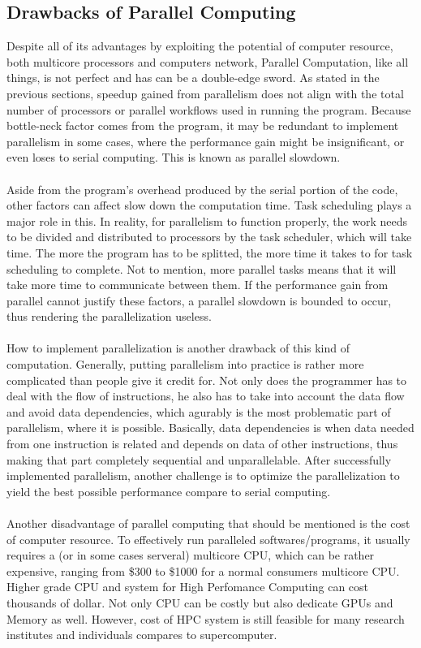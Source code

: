\subsection{Drawbacks of Parallel Computing}
Despite all of its advantages by exploiting the potential of computer resource, both multicore processors and computers network, Parallel Computation, like all things, is not perfect and has can be a double-edge sword. As stated in the previous sections, speedup gained from parallelism does not align with the total number of processors or parallel workflows used in running the program. Because bottle-neck factor comes from the program, it may be redundant to implement parallelism in some cases, where the performance gain might be insignificant, or even loses to serial computing. This is known as parallel slowdown. \\
~\\
Aside from the program's overhead produced by the serial portion of the code, other factors can affect slow down the computation time. Task scheduling plays a major role in this. In reality, for parallelism to function properly, the work needs to be divided and distributed to processors by the task scheduler, which will take time. The more the program has to be splitted, the more time it takes to for task scheduling to complete. Not to mention, more parallel tasks means that it will take more time to communicate between them. If the performance gain from parallel cannot justify these factors, a parallel slowdown is bounded to occur, thus rendering the parallelization useless. \\
~\\
How to implement parallelization is another drawback of this kind of computation. Generally, putting parallelism into practice is rather more complicated than people give it credit for. Not only does the programmer has to deal with the flow of instructions, he also has to take into account the data flow and avoid data dependencies, which agurably is the most problematic part of parallelism, where it is possible. Basically, data dependencies is when data needed from one instruction is related and depends on data of other instructions, thus making that part completely sequential and unparallelable. After successfully implemented parallelism, another challenge is to optimize the parallelization to yield the best possible performance compare to serial computing. \\
~\\
Another disadvantage of parallel computing that should be mentioned is the cost of computer resource. To effectively run paralleled softwares/programs, it usually requires a (or in some cases serveral) multicore CPU, which can be rather expensive, ranging from \$300 to \$1000 for a normal consumers multicore CPU. Higher grade CPU and system for High Perfomance Computing can cost thousands of dollar. Not only CPU can be costly but also dedicate GPUs and Memory as well. However, cost of HPC system is still feasible for many research institutes and individuals compares to supercomputer. \\


